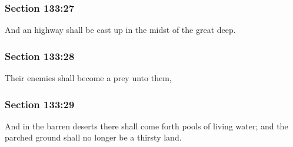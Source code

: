 	\subsubsection{Section 133:27} %
		\label{DC133-27}

		And an highway shall be cast up in the midst of the great deep.


	\subsubsection{Section 133:28} %
		\label{DC133-28}

		Their enemies shall become a prey unto them,


	\subsubsection{Section 133:29} %
		\label{DC133-29}

		And in the barren deserts there shall come forth pools of living water; and the parched ground shall no longer be a thirsty land.


